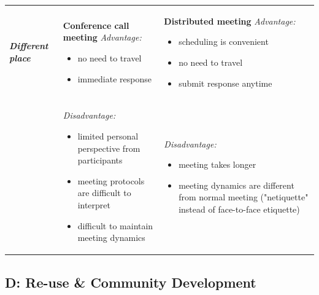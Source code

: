 \begin{table}[!htb]
\begin{center}
\begin{tabular}{ L{2cm} L{5.75cm}  L{5.75cm}}
\textbf{\textit{Different place}} & \textbf{Conference call meeting} \qquad \textit{Advantage:} 
\vspace{-3mm}
\begin{itemize}[itemsep=0pt,parsep=0pt]
    \setlength{\itemsep}{0pt}%
    \setlength{\parskip}{0pt}%
	\item{no need to travel}
	\item{immediate response}
\end{itemize} &
\textbf{Distributed meeting} \qquad \textit{Advantage:} 
\vspace{-3mm}
\begin{itemize}[itemsep=0pt,parsep=0pt]
    \setlength{\itemsep}{0pt}%
    \setlength{\parskip}{0pt}%
	\item{scheduling is convenient}
	\item{no need to travel}
	\item{submit response anytime}
\end{itemize} 
\\
& \textit{Disadvantage:} 
\vspace{-3mm}
\begin{itemize}[itemsep=0pt,parsep=0pt]
    \setlength{\itemsep}{0pt}%
    \setlength{\parskip}{0pt}%
	\item{limited personal perspective from participants}
	\item{meeting protocols are difficult to interpret}
	\item{difficult to maintain meeting dynamics}
\end{itemize} &
\textit{Disadvantage:} 
\vspace{-3mm}
\begin{itemize}[itemsep=0pt,parsep=0pt]
    \setlength{\itemsep}{0pt}%
    \setlength{\parskip}{0pt}%
	\item{meeting takes longer}
	\item{meeting dynamics are different from normal meeting ("netiquette" instead of face-to-face etiquette)}
\end{itemize} 
\\ \hline
\end{tabular}
\end{center}
\end{table}


\subsection{D: Re-use \& Community Development} \label{sec:reuse}

